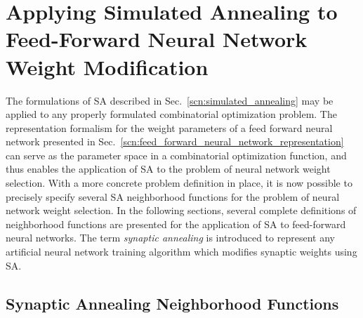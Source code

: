 \documentclass[11pt]{afthesis}
\begin{document}
	\section{Applying Simulated Annealing to Feed-Forward Neural Network Weight Modification}
	
	The formulations of SA described in Sec.~\ref{scn:simulated_annealing} may be applied to any properly formulated combinatorial optimization problem. The representation formalism for the weight parameters of a feed forward neural network presented in Sec.~\ref{scn:feed_forward_neural_network_representation} can serve as the parameter space in a combinatorial optimization function, and thus enables the application of SA to the problem of neural network weight selection. With a more concrete problem definition in place, it is now possible to precisely specify several SA neighborhood functions for the problem of neural network weight selection. In the following sections, several complete definitions of neighborhood functions are presented for the application of SA to feed-forward neural networks. The term \textit{synaptic annealing} is introduced to represent any artificial neural network training algorithm which modifies synaptic weights using SA.
	
	
	\subsection{Synaptic Annealing Neighborhood Functions}
	\label{scn:classical_neighborhood}
	
	
\end{document}
